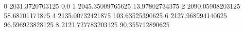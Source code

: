 0 2031.3720703125 0.0
1 2045.35009765625 13.97802734375
2 2090.05908203125 58.68701171875
4 2135.00732421875 103.63525390625
6 2127.968994140625 96.596923828125
8 2121.727783203125 90.355712890625
